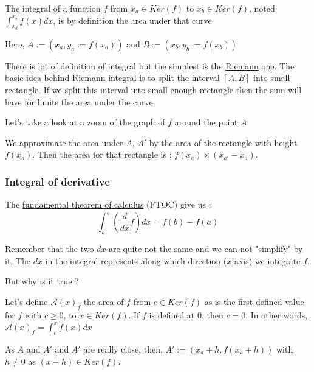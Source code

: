 \documentclass[12pt]{article}
\begin{document}
The integral of a function $f$ from $x_a \in Ker(f)$ to $x_b \in Ker(f)$, noted $\int_{x_a}^{x_b} f(x)dx$, is by definition the area under that curve 

\begin{figure}[H]
 \centering
 
\end{figure}

Here, $A := (x_a, y_a:=f(x_a))$ and $B := (x_b, y_b:=f(x_b))$

There is lot of definition of integral but the simplest is the \href{https://en.wikipedia.org/wiki/Riemann_integral}{Riemann} one. The basic idea behind Riemann integral is to split the interval $[A, B]$ into small rectangle. If we split this interval into small enough rectangle then the sum will have for limits the area under the curve.

Let's take a look at a zoom of the graph of $f$ around the point $A$


\begin{figure}[H]
 \centering
 
\end{figure}

We approximate the area under $A$, $A'$ by the area of the rectangle with height $f(x_a)$. Then the area for that rectangle is : $f(x_a) \times (x_{a'} - x_a)$.

\subsubsection{Integral of derivative}

The \href{https://en.wikipedia.org/wiki/Fundamental_theorem_of_calculus}{fundamental theorem of calculus} (FTOC) give us : 
$$ \int_a^b (\frac{d}{dx}f)dx = f(b) - f(a) $$

Remember that the two $dx$ are quite not the same and we can not "simplify" by it. The $dx$ in the integral represents along which direction ($x$ axis) we integrate $f$.

But why is it true ?

Let's define $\mathcal{A}(x)_f$ the area of $f$ from $c \in Ker(f)$ as is the first defined value for $f$ with $c \geq 0$, to $x \in Ker(f)$. If $f$ is defined at $0$, then $c=0$. In other words, $\mathcal{A}(x)_f = \int_c^{x}f(x)dx$

As $A$ and $A'$ and $A'$ are really close, then, $A' := (x_a+h, f(x_a+h))$ with $h \neq 0$ as $(x+h) \in Ker(f)$.
\end{document}
